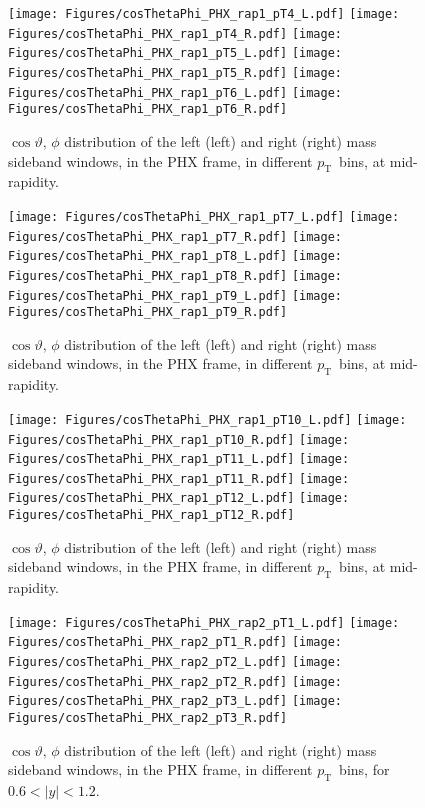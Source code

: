 \documentclass[12pt]{article}
\newcommand{\pt}{$p_{\mathrm{T}}$}
\begin{document}
\begin{figure}[htbp]
\centering
\texttt{[image: Figures/cosThetaPhi\_PHX\_rap1\_pT4\_L.pdf]}
\texttt{[image: Figures/cosThetaPhi\_PHX\_rap1\_pT4\_R.pdf]}
\texttt{[image: Figures/cosThetaPhi\_PHX\_rap1\_pT5\_L.pdf]}
\texttt{[image: Figures/cosThetaPhi\_PHX\_rap1\_pT5\_R.pdf]}
\texttt{[image: Figures/cosThetaPhi\_PHX\_rap1\_pT6\_L.pdf]}
\texttt{[image: Figures/cosThetaPhi\_PHX\_rap1\_pT6\_R.pdf]}
\caption{$\cos\vartheta,\,\phi$ distribution of the left (left) and
  right (right) mass sideband windows, in the PHX frame, in different
  \pt\ bins, at mid-rapidity.} 
\end{figure}
\clearpage

\begin{figure}[htbp]
\centering
\texttt{[image: Figures/cosThetaPhi\_PHX\_rap1\_pT7\_L.pdf]}
\texttt{[image: Figures/cosThetaPhi\_PHX\_rap1\_pT7\_R.pdf]}
\texttt{[image: Figures/cosThetaPhi\_PHX\_rap1\_pT8\_L.pdf]}
\texttt{[image: Figures/cosThetaPhi\_PHX\_rap1\_pT8\_R.pdf]}
\texttt{[image: Figures/cosThetaPhi\_PHX\_rap1\_pT9\_L.pdf]}
\texttt{[image: Figures/cosThetaPhi\_PHX\_rap1\_pT9\_R.pdf]}
\caption{$\cos\vartheta,\,\phi$ distribution of the left (left) and
  right (right) mass sideband windows, in the PHX frame, in different
  \pt\ bins, at mid-rapidity.}
\end{figure}
\clearpage

\begin{figure}[htbp]
\centering
\texttt{[image: Figures/cosThetaPhi\_PHX\_rap1\_pT10\_L.pdf]}
\texttt{[image: Figures/cosThetaPhi\_PHX\_rap1\_pT10\_R.pdf]}
\texttt{[image: Figures/cosThetaPhi\_PHX\_rap1\_pT11\_L.pdf]}
\texttt{[image: Figures/cosThetaPhi\_PHX\_rap1\_pT11\_R.pdf]}
\texttt{[image: Figures/cosThetaPhi\_PHX\_rap1\_pT12\_L.pdf]}
\texttt{[image: Figures/cosThetaPhi\_PHX\_rap1\_pT12\_R.pdf]}
\caption{$\cos\vartheta,\,\phi$ distribution of the left (left) and
  right (right) mass sideband windows, in the PHX frame, in different
  \pt\ bins, at mid-rapidity.} 
\end{figure}
\clearpage

\begin{figure}[htbp]
\centering
\texttt{[image: Figures/cosThetaPhi\_PHX\_rap2\_pT1\_L.pdf]}
\texttt{[image: Figures/cosThetaPhi\_PHX\_rap2\_pT1\_R.pdf]}
\texttt{[image: Figures/cosThetaPhi\_PHX\_rap2\_pT2\_L.pdf]}
\texttt{[image: Figures/cosThetaPhi\_PHX\_rap2\_pT2\_R.pdf]}
\texttt{[image: Figures/cosThetaPhi\_PHX\_rap2\_pT3\_L.pdf]}
\texttt{[image: Figures/cosThetaPhi\_PHX\_rap2\_pT3\_R.pdf]}
\caption{$\cos\vartheta,\,\phi$ distribution of the left (left) and
  right (right) mass sideband windows, in the PHX frame, in different
  \pt\ bins, for $0.6 < |y| < 1.2$.}
\end{figure}
\clearpage
\end{document}
